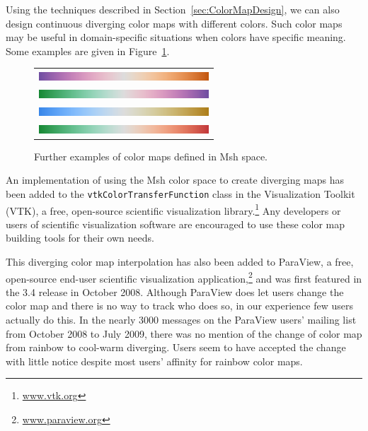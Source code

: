 \documentclass{llncs}
\newcommand{\Msh}{Msh\xspace}
\begin{document}
Using the techniques described in Section~\ref{sec:ColorMapDesign}, we can
also design continuous diverging color maps with different colors.  Such
color maps may be useful in domain-specific situations when colors have
specific meaning.  Some examples are given in
Figure~\ref{fig:OtherColorMaps}.

\begin{figure}
  \centering
  \begin{tabular}{c}
    \includegraphics[width=2.5in]{images/Purple2OrangeBar} \\
    \includegraphics[width=2.5in]{images/Green2PurpleBar} \\
    \includegraphics[width=2.5in]{images/Blue2TanBar} \\
    \includegraphics[width=2.5in]{images/Green2RedDivBar}
  \end{tabular}
  \caption{Further examples of color maps defined in \Msh space.}
  \label{fig:OtherColorMaps}
\end{figure}

  An implementation of using the \Msh color space to create diverging maps
  has been added to the \texttt{vtkColorTransferFunction} class in the
  Visualization Toolkit (VTK), a free, open-source scientific visualization
  library.\footnote{\href{http://www.vtk.org}{www.vtk.org}} Any developers
  or users of scientific visualization software are encouraged to use these
  color map building tools for their own needs.

  This diverging color map interpolation has also been added to ParaView, a
  free, open-source end-user scientific visualization
  application,\footnote{\href{http://www.paraview.org}{www.paraview.org}}
  and was first featured in the 3.4 release in October 2008.  Although
  ParaView does let users change the color map and there is no way to track
  who does so, in our experience few users actually do this.  In the nearly
  3000 messages on the ParaView users' mailing list from October 2008 to
  July 2009, there was no mention of the change of color map from rainbow
  to cool-warm diverging.  Users seem to have accepted the change with
  little notice despite most users' affinity for rainbow color maps.
\end{document}
